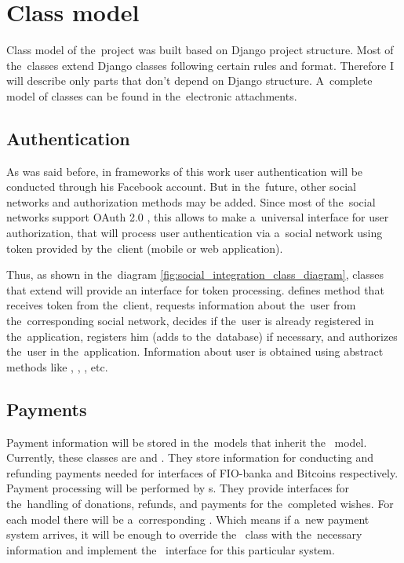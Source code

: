 \section{Class model}
Class model of the~project was built based on Django project structure. Most of the~classes extend Django classes
following certain rules and format. Therefore I will describe only parts that don't depend on Django structure.
A~complete model of classes can be found in the~electronic attachments.

\subsection{Authentication}
As was said before, in frameworks of this work user authentication will be conducted through his Facebook account. But
in the~future, other social networks and authorization methods may be added. Since most of the~social networks support
OAuth 2.0 \cite{oauth}, this allows to make a~universal interface for user authorization, that will process user
authentication via a~social network using token provided by the~client (mobile or web application).

Thus, as shown in the~diagram \ref{fig:social_integration_class_diagram}, classes that extend 
will provide an interface for token processing.  defines method  that receives
token from the~client, requests information about the~user from the~corresponding social network, decides if the~user is
already registered in the~application, registers him (adds to the~database) if necessary, and authorizes the~user in
the~application. Information about user is obtained using abstract methods like ,
, , etc.



\subsection{Payments}
Payment information will be stored in the~models that inherit the~ model. Currently, these classes are
 and . They store information for conducting and refunding payments needed
for inter\-faces of FIO-banka and Bitcoins respectively. Payment processing will be performed by s.
They provide interfaces for the~handling of donations, refunds, and payments for the~completed wishes. For each
 model there will be a~corresponding . Which means if a~new payment system
arrives, it will be enough to override the~ class with the~necessary information and implement
the~ interface for this particular system.

